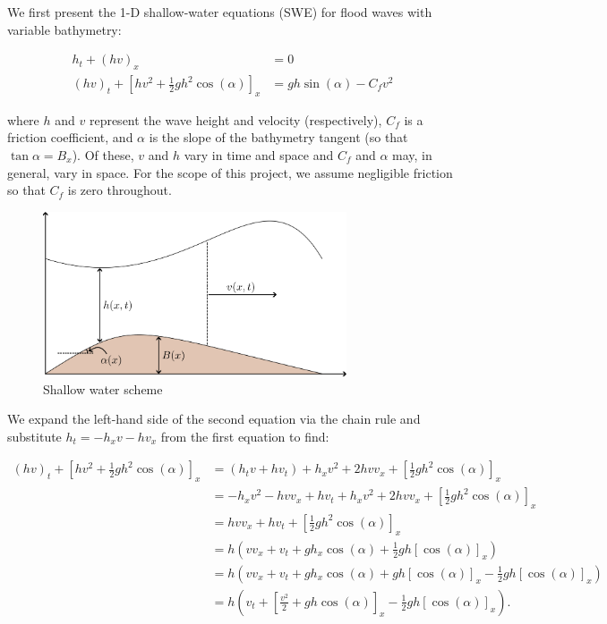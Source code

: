 We first present the 1-D shallow-water equations (SWE) for flood waves with variable bathymetry\cite{whitham1999_ch3}:

\begin{align*}
    h_t + (h v)_x &= 0 \\
    (h v)_t + \left[ hv^2 + \frac{1}{2} g h^2 \cos{(\alpha)} \right]_x &= g h \sin{(\alpha)} - C_f v^2
\end{align*}

where $h$ and $v$ represent the wave height and velocity (respectively), $C_f$ is a friction coefficient, and $\alpha$
is the slope of the bathymetry tangent (so that $\tan{\alpha} = B_x$). Of these, $v$ and $h$ vary in time and space and 
$C_f$ and $\alpha$ may, in general, vary in space. For the scope of this project, we assume negligible friction so that 
$C_f$ is zero throughout. 

\begin{figure}[h]
    \centering
    \includegraphics[width=0.8\textwidth]{images/swe_diagram.png}
    \caption{Shallow water scheme}
\end{figure}

\pagebreak
We expand the left-hand side of the second equation via the
chain rule and substitute $h_t = -h_x v - h v_x$ from the first equation to find: 

\begin{align*}
    (h v)_t + \left[ hv^2 + \frac{1}{2} g h^2 \cos{(\alpha)} \right]_x 
        &= \left( h_t v + h v_t \right) + h_x v^2 + 2 h v v_x + \left[ \frac{1}{2} g h^2 \cos{(\alpha)} \right]_x \\
        &= -h_x v^2 - h v v_x + h v_t + h_x v^2 + 2 h v v_x + \left[ \frac{1}{2} g h^2 \cos{(\alpha)} \right]_x \\
        &=  h v v_x + h v_t + \left[ \frac{1}{2} g h^2 \cos{(\alpha)} \right]_x \\
        &=  h \left( v v_x + v_t + g h_x \cos{(\alpha)} + \frac{1}{2} g h [\cos{(\alpha)}]_x \right) \\
        &=  h \left( v v_x + v_t + g h_x \cos{(\alpha)} + g h [\cos{(\alpha)}]_x - \frac{1}{2} g h [\cos{(\alpha)}]_x \right) \\
        &=  h \left( v_t + \left[ \frac{v^2}{2} + g h \cos{(\alpha)} \right]_x - \frac{1}{2} g h [\cos{(\alpha)}]_x \right).
\end{align*}

